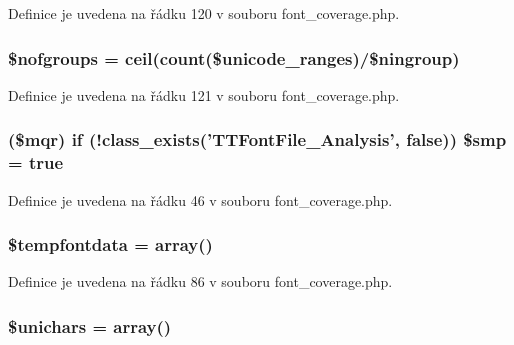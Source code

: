 Definice je uvedena na řádku 120 v souboru font\-\_\-coverage.\-php.

\hypertarget{font__coverage_8php_a24671fbe97d92adec47bb01f3c5b389b}{
\subsubsection[{\$nofgroups}]{\setlength{\rightskip}{0pt plus 5cm}\$nofgroups = ceil(count(\$unicode\-\_\-ranges)/\$ningroup)}}\label{font__coverage_8php_a24671fbe97d92adec47bb01f3c5b389b}


Definice je uvedena na řádku 121 v souboru font\-\_\-coverage.\-php.

\hypertarget{font__coverage_8php_af4d78da859f2fb6f8d313e16bba59647}{
\subsubsection[{\$smp}]{ (\$mqr) {\bf if} (!class\-\_\-exists('T\-T\-Font\-File\-\_\-\-Analysis', {\bf false})) \$smp = true}}\label{font__coverage_8php_af4d78da859f2fb6f8d313e16bba59647}


Definice je uvedena na řádku 46 v souboru font\-\_\-coverage.\-php.

\hypertarget{font__coverage_8php_a47be5bc20842a7025769908c5470c016}{
\subsubsection[{\$tempfontdata}]{\setlength{\rightskip}{0pt plus 5cm}\$tempfontdata = array()}}\label{font__coverage_8php_a47be5bc20842a7025769908c5470c016}


Definice je uvedena na řádku 86 v souboru font\-\_\-coverage.\-php.

\hypertarget{font__coverage_8php_ab216a6d320faf1beba59f97c9941d866}{
\subsubsection[{\$unichars}]{\setlength{\rightskip}{0pt plus 5cm}\$unichars = array()}}\label{font__coverage_8php_ab216a6d320faf1beba59f97c9941d866}


